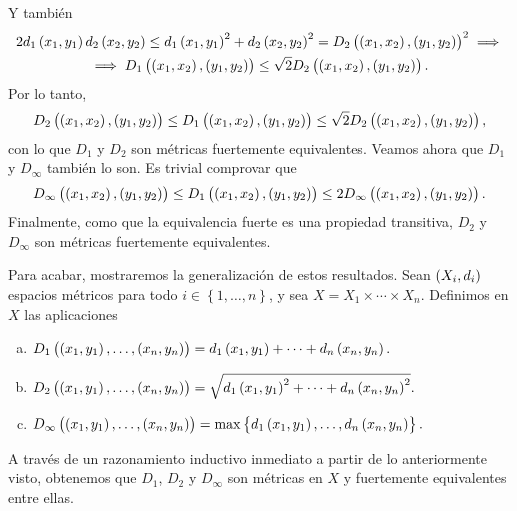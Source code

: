 \begin{ej}
\[    \]
    Y también
    \begin{gather*}
        2d_1\left( x_1, y_1 \right) d_2 \left( x_2, y_2 \right) \leq d_1\left( x_1, y_1 \right) ^2 + d_2 \left( x_2, y_2 \right) ^2 = D_2 \left( \left( x_1, x_2 \right) , \left( y_1 , y_2 \right) \right)^2 \implies \\
        \implies D_1 \left( \left( x_1, x_2 \right) , \left( y_1 , y_2 \right) \right) \leq \sqrt{2} D_2 \left( \left( x_1, x_2 \right) , \left( y_1 , y_2 \right) \right).
    \end{gather*}
    Por lo tanto,
    \[
        D_2 \left( \left( x_1, x_2 \right) , \left( y_1 , y_2 \right) \right) \leq D_1 \left( \left( x_1, x_2 \right) , \left( y_1 , y_2 \right) \right) \leq \sqrt{2} D_2 \left( \left( x_1, x_2 \right) , \left( y_1 , y_2 \right) \right),
    \]
    con lo que $D_1$ y $D_2$ son métricas fuertemente equivalentes. Veamos ahora que $D_1$ y $D_{\infty}$ también lo son. Es trivial comprovar que
    \[
        D_{\infty} \left( \left( x_1, x_2 \right) , \left( y_1 , y_2 \right) \right) \leq D_1 \left( \left( x_1, x_2 \right) , \left( y_1 , y_2 \right) \right) \leq 2 D_{\infty} \left( \left( x_1, x_2 \right) , \left( y_1 , y_2 \right) \right).
    \]
    Finalmente, como que la equivalencia fuerte es una propiedad transitiva, $D_2$ y $D_{\infty}$ son métricas fuertemente equivalentes.
    
    Para acabar, mostraremos la generalización de estos resultados. Sean $\left( X_i, d_i \right)$ espacios métricos para todo $i \in \left\{1, \dots , n \right\}$, y sea $X=X_1 \times \cdots \times X_n$. Definimos en $X$ las aplicaciones
    \begin{enumerate}[(a)]
        \item $D_1\left( \left( x_1, y_1 \right), \dots , \left( x_n, y_n \right) \right) = d_1\left( x_1, y_1 \right) + \cdots + d_n \left( x_n, y_n \right).$
        \item $D_2\left( \left( x_1, y_1 \right), \dots , \left( x_n, y_n \right) \right) = \sqrt{d_1\left( x_1, y_1 \right)^2 + \cdots + d_n \left( x_n, y_n \right)^2}.$
        \item $D_{\infty}\left( \left( x_1, y_1 \right), \dots , \left( x_n, y_n \right) \right) = \max \left\{d_1\left( x_1, y_1 \right), \dots, d_n \left( x_n, y_n \right) \right\}.$
    \end{enumerate}
    A través de un razonamiento inductivo inmediato a partir de lo anteriormente visto, obtenemos que $D_1$, $D_2$ y $D_{\infty}$ son métricas en $X$ y fuertemente equivalentes entre ellas.
\end{ej}
